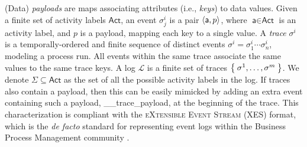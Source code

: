 (Data) \textit{payloads} are maps  associating attributes (i.e., \textit{keys}) to data values. %
Given a finite set of activity labels $\textsf{Act}$, an event $\sigma_j^{i}$ is a pair $\Braket{\textsf{a},p}$, where $\textsf{a}\in\textsf{Act}$ is an activity label, and $p$ is a payload, mapping each key to a single value. %
A \textit{trace} $\sigma^i$ is a temporally-ordered and finite sequence of distinct events $\sigma^i=\sigma_1^i\cdots\sigma_n^i$, modeling a process run. %
All events within the same trace associate the same values to the same trace keys. %
A log $\mathcal{L}$ is a finite set of traces $\Set{\sigma^1,\dots,\sigma^m}$. We denote  $\Sigma\subseteq\textsf{Act}$ as the set of all the possible activity labels in the log. If traces also contain a payload, then this can be easily mimicked by adding an extra event containing such a payload, \textsf{\_\_trace\_payload}, at the beginning of the trace. This  characterization \cite{bpm21} is compliant with the \textsc{eXtensible Event Stream} (XES) format, which is the \textit{de facto} standard for representing event logs within the Business Process Management community \cite{XES}. %